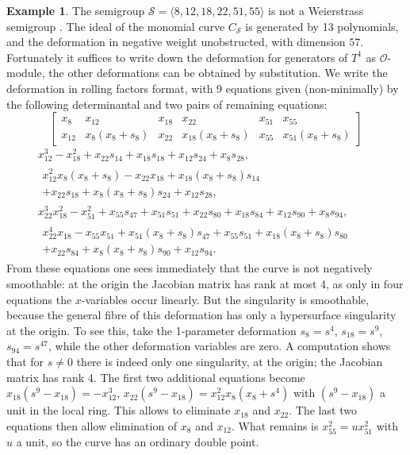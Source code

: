 \documentclass{amsart}
\renewcommand{\S}{\mathcal S}
\newcommand{\mO}{\mathcal{O}}
\theoremstyle{definition}
\newtheorem{ex}[thm]{Example}
\theoremstyle{remark}
\begin{document}
\begin{ex}\label{ex:negsmooth}
The semigroup $\S=\langle8,12,18,22,51,55\rangle$ is not a Weierstrass semigroup
\cite[Example 5.1]{Ko2}.
%
The ideal of  the monomial curve
$C_\S$  is generated by 13 polynomials, and the deformation in negative weight unobstructed, with dimension $57$. Fortunately it
suffices to write down  the deformation for generators of $T^1$ as $\mO$-module, the other
deformations can be obtained by substitution.
We write the deformation in
rolling factors format, with 9 equations given (non-minimally) by the following determinantal
and two pairs of remaining equations:
\[
\begin{bmatrix}
x_{8}   &   x_{12}  & x_{18}  & x_{22}  & x_{51} & x_{55} \\
x_{12}  &  x_8(x_8+s_8) & x_{22} &   x_{18}(x_8+s_8)  & x_{55}& x_{51}(x_8+s_8) 
\end{bmatrix}
\]
\begin{gather*}
x_{12}^3-x_{18}^2+  x_{22} s_{14}+x_{18} s_{18}+x_{12} s_{24}+x_8 s_{28},  \\                                                                  
\begin{split}
x_{12}^2 x_8 (x_8+s_8)-x_{22} x_{18}+x_{18} (x_8+s_8) s_{14} \qquad\\+  x_{22} s_{18}
+x_8 (x_8+s_8) s_{24} +x_{12} s_{28},\end{split} \\
x_{22}^3 x_{18}^2-x_{51}^2 +   x_{55} s_{47}+x_{51} s_{51}+x_{22} s_{80}+x_{18} s_{84}+x_{12} s_{90}+x_8 s_{94}, \\
\begin{split}
 x_{22}^4 x_{18}-x_{55} x_{51}+ x_{51} (x_8+s_8) s_{47}+x_{55} s_{51}+x_{18} (x_8+s_{8}) s_{80}\qquad\\+x_{22} s_{84}+x_8 (x_8+s_{8}) s_{90}+x_{12} s_{94}.\end{split}
\end{gather*}
%
From these equations one sees immediately that the curve is not negatively smoothable: at the origin the Jacobian matrix has rank at most  4, as only in four equations the $x$-variables occur linearly.
But the singularity is smoothable, because the general fibre of this deformation
has only a hypersurface singularity at the origin. To see this, 
take the 1-parameter deformation  $s_8=s^4$, $s_{18}=s^9$, $s_{94}=s^{47}$,  while the
other deformation variables are zero.
A computation shows that for $s\neq0$  there is indeed only one singularity, at the origin; the
Jacobian matrix has rank 4.
The first two additional equations become $x_{18}(s^9-x_{18})=-x_{12}^3$,                                                                   
$x_{22}(s^9-x_{18})=x_{12}^2 x_8 (x_8+s^4)$ with $(s^9-x_{18})$ a unit in the local ring.
This allows to eliminate $x_{18}$ and $x_{22}$. The last two equations  then allow
elimination of $x_8$ and $x_{12}$. What remains is $x_{55}^2=ux_{51}^2$ with  $u$ a unit,
so the curve has an ordinary double point.
\end{ex}
\end{document}
